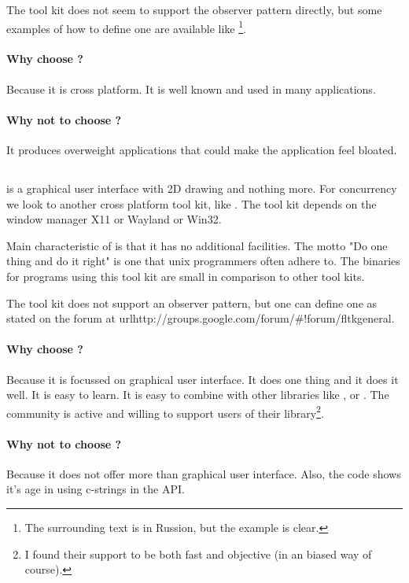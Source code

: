 The tool kit  does not seem to support the observer pattern
directly, but some examples of how to define one are available like
\cite{wxwidget:observer-example}\footnote{The surrounding text is in Russion,
but the example is clear.}.

\paragraph{Why choose ?} Because it is cross platform. It is well
known and used in many applications.
 
\paragraph{Why not to choose ?} It produces overweight applications
that could make the application feel bloated.

\subsection{}

 is a graphical user interface with 2D drawing and nothing more. For
concurrency we look to another cross platform tool kit, like . The
tool kit  depends on the window manager X11 or Wayland or Win32.

Main characteristic of  is that it has no additional facilities.  The
motto "Do one thing and do it right" is one that unix programmers often adhere
to. The binaries for programs using this tool kit are small in comparison to
other tool kits. 

The tool kit  does not support an observer pattern, but one can define
one as stated on the forum at
url{http://groups.google.com/forum/\#!forum/fltkgeneral}.

\paragraph{Why choose ?} Because it is focussed on graphical user
interface.  It does one thing and it does it well. It is easy to learn. It is
easy to combine with other libraries like ,  or .
The community is active and willing to support users of their
library\footnote{I found their support to be both fast and objective (in an
 biased way of course).}. 

\paragraph{Why not to choose ?} Because it does not offer more than
graphical user interface. Also, the code shows it's age in using c-strings in
the API.

